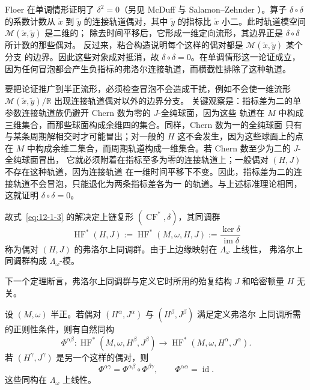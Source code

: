 Floer  在单调情形证明了 $\delta^2=0$（另见 McDuff  与
Salamon--Zehnder ）。算子 $\delta\circ\delta$ 的系数计数从
$\widetilde x$ 到 $\widetilde y$ 的连接轨道偶对，其中 $\widetilde y$ 的指标比
$\widetilde x$ 小二。此时轨道模空间 $\mathcal M(\widetilde x,\widetilde y)$ 是二维的；
除去时间平移后，它形成一维定向流形，其边界正是 $\delta\circ\delta$ 所计数的那些偶对。
反过来，粘合构造说明每个这样的偶对都是 $\mathcal M(\widetilde x,\widetilde y)$ 某个分支
的边界。因此这些对象成对抵消，故 $\delta\circ\delta=0$。在单调情形这一论证成立，
因为任何冒泡都会产生负指标的弗洛尔连接轨道，而横截性排除了这种轨道。

要把论证推广到半正流形，必须检查冒泡不会造成干扰，例如不会使一维流形
$\mathcal M(\widetilde x,\widetilde y)/\mathbb R$ 出现连接轨道偶对以外的边界分支。
关键观察是：指标差为二的单参数连接轨道族仍避开 Chern 数为零的 $J$-全纯球面，因为这些
轨道在 $M$ 中构成三维集合，而那些球面构成余维四的集合。同样，Chern 数为一的全纯球面
只有与某条周期解相交时才可能冒出；对一般的 $H$ 这不会发生，因为这些球面上的点在 $M$
中构成余维二集合，而周期轨道构成一维集合。若 Chern 数至少为二的 $J$-全纯球面冒出，
它就必须附着在指标至多为零的连接轨道上；一般偶对 $(H,J)$ 不存在这种轨道，因为连接轨道
在一维时间平移下不变。因此，指标差为二的连接轨道不会冒泡，只能退化为两条指标差各为一
的轨道。与上述标准理论相同，这就证明 $\delta\circ\delta=0$。

故式~\eqref{eq:12-1-3} 的解决定上链复形 $(\operatorname{CF}^*,\delta)$，其同调群
\[
  \operatorname{HF}^*(H,J):=\operatorname{HF}^*(M,\omega,H,J)
  :=\frac{\ker\delta}{\operatorname{im}\delta}
\]
称为偶对 $(H,J)$ 的弗洛尔上同调群。由于上边缘映射在 $\Lambda_\omega$ 上线性，
弗洛尔上同调群构成 $\Lambda_\omega$-模。

下一个定理断言，弗洛尔上同调群与定义它时所用的殆复结构 $J$ 和哈密顿量 $H$ 无关。

\begin{theorem}\label{thm:12-1-3}
设 $(M,\omega)$ 半正。若偶对 $(H^\alpha,J^\alpha)$ 与 $(H^\beta,J^\beta)$ 满足定义弗洛尔
上同调所需的正则性条件，则有自然同构
\[
  \Phi^{\alpha\beta}:\operatorname{HF}^*(M,\omega,H^\beta,J^\beta)
  \longrightarrow\operatorname{HF}^*(M,\omega,H^\alpha,J^\alpha).
\]
若 $(H^\gamma,J^\gamma)$ 是另一个这样的偶对，则
\[
  \Phi^{\alpha\gamma}=\Phi^{\alpha\beta}\circ\Phi^{\beta\gamma},
  \qquad \Phi^{\alpha\alpha}=\operatorname{id}.
\]
这些同构在 $\Lambda_\omega$ 上线性。
\end{theorem}

